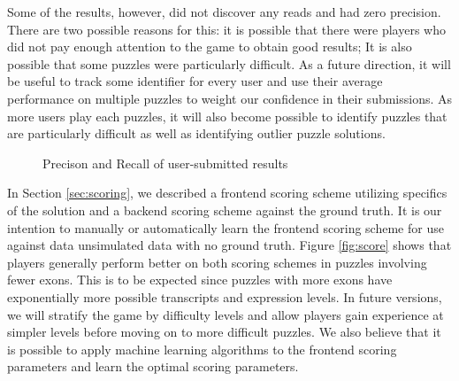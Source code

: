 \documentclass[12pt]{article}
\begin{document}
Some of the results, however, did not discover any reads and had zero precision. There are two possible reasons for this: it is possible that there were players who did not pay enough attention to the game to obtain good results; It is also possible that some puzzles were particularly difficult. As a future direction, it will be useful to track some identifier for every user and use their average performance on multiple puzzles to weight our confidence in their submissions. As more users play each puzzles, it will also become possible to identify puzzles that are particularly difficult as well as identifying outlier puzzle solutions.

\begin{figure}[H]
\centering
{} 
\caption{Precison and Recall of user-submitted results}\label{fig:precisionandrecall}
\end{figure}

In Section \ref{sec:scoring}, we described a frontend scoring scheme utilizing specifics of the solution and a backend scoring scheme against the ground truth. It is our intention to manually or automatically learn the frontend scoring scheme for use against data unsimulated data with no ground truth. Figure \ref{fig:score} shows that players generally perform better on both scoring schemes in puzzles involving fewer exons. This is to be expected since puzzles with more exons have exponentially more possible transcripts and expression levels. In future versions, we will stratify the game by difficulty levels and allow players gain experience at simpler levels before moving on to more difficult puzzles. We also believe that it is possible to apply machine learning algorithms to the frontend scoring parameters and learn the optimal scoring parameters.
\end{document}
